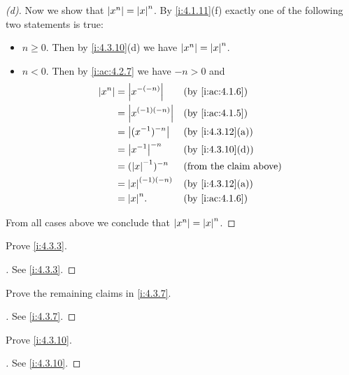 \begin{proof}[(d)]
  Now we show that \(\left\lvert x^n\right\rvert = \left\lvert x\right\rvert^n\).
  By \cref{i:4.1.11}(f) exactly one of the following two statements is true:
  \begin{itemize}
    \item \(n \geq 0\).
          Then by \cref{i:4.3.10}(d) we have \(\left\lvert x^n\right\rvert = \left\lvert x\right\rvert^n\).
    \item \(n < 0\).
          Then by \cref{i:ac:4.2.7} we have \(-n > 0\) and
          \begin{align*}
            \abs{x^n} & = \abs{x^{-(-n)}}     &  & \by{i:ac:4.1.6}               \\
                      & = \abs{x^{(-1) (-n)}} &  & \by{i:ac:4.1.5}               \\
                      & = \abs{(x^{-1})^{-n}} &  & \by{i:4.3.12}[a]              \\
                      & = \abs{x^{-1}}^{-n}   &  & \by{i:4.3.10}[d]              \\
                      & = (\abs{x}^{-1})^{-n} &  & \text{(from the claim above)} \\
                      & = \abs{x}^{(-1) (-n)} &  & \by{i:4.3.12}[a]              \\
                      & = \abs{x}^n.          &  & \by{i:ac:4.1.6}
          \end{align*}
  \end{itemize}
  From all cases above we conclude that \(\left\lvert x^n\right\rvert = \left\lvert x\right\rvert^n\).
\end{proof}

\exercisesection

\begin{ex}\label{i:ex:4.3.1}
  Prove \cref{i:4.3.3}.
\end{ex}

\begin{proof}[]
  See \cref{i:4.3.3}.
\end{proof}

\begin{ex}\label{i:ex:4.3.2}
  Prove the remaining claims in \cref{i:4.3.7}.
\end{ex}

\begin{proof}[]
  See \cref{i:4.3.7}.
\end{proof}

\begin{ex}\label{i:ex:4.3.3}
  Prove \cref{i:4.3.10}.
\end{ex}

\begin{proof}[]
  See \cref{i:4.3.10}.
\end{proof}

